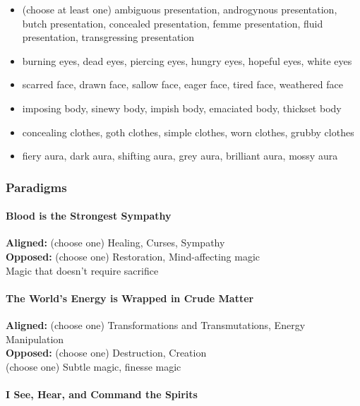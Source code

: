 \documentclass[
]{article}
\providecommand{\tightlist}{%
  \setlength{\itemsep}{0pt}\setlength{\parskip}{0pt}}
\begin{document}
\begin{itemize}
\tightlist
\item
  (choose at least one) ambiguous presentation, androgynous
  presentation, butch presentation, concealed presentation, femme
  presentation, fluid presentation, transgressing presentation
\item
  burning eyes, dead eyes, piercing eyes, hungry eyes, hopeful eyes,
  white eyes
\item
  scarred face, drawn face, sallow face, eager face, tired face,
  weathered face
\item
  imposing body, sinewy body, impish body, emaciated body, thickset body
\item
  concealing clothes, goth clothes, simple clothes, worn clothes, grubby
  clothes
\item
  fiery aura, dark aura, shifting aura, grey aura, brilliant aura, mossy
  aura
\end{itemize}

\hypertarget{paradigms-5}{%
\subsubsection{Paradigms}\label{paradigms-5}}

\hypertarget{blood-is-the-strongest-sympathy}{%
\paragraph{Blood is the Strongest
Sympathy}\label{blood-is-the-strongest-sympathy}}

\textbf{Aligned:} (choose one) Healing, Curses, Sympathy\\
\textbf{Opposed:} (choose one) Restoration, Mind-affecting magic\\
Magic that doesn't require sacrifice

\hypertarget{the-worlds-energy-is-wrapped-in-crude-matter}{%
\paragraph{The World's Energy is Wrapped in Crude
Matter}\label{the-worlds-energy-is-wrapped-in-crude-matter}}

\textbf{Aligned:} (choose one) Transformations and Transmutations,
Energy Manipulation\\
\textbf{Opposed:} (choose one) Destruction, Creation\\
(choose one) Subtle magic, finesse magic

\hypertarget{i-see-hear-and-command-the-spirits}{%
\paragraph{I See, Hear, and Command the
Spirits}\label{i-see-hear-and-command-the-spirits}}
\end{document}
